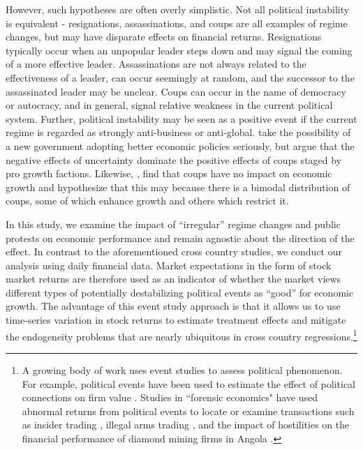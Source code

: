 \documentclass[12pt,final,fleqn]{article}
\theoremstyle{plain}
\begin{document}
However, such hypotheses are often overly simplistic. Not all political instability is equivalent - resignations, assassinations, and coups are all examples of regime changes, but may have disparate effects on financial returns. Resignations typically occur when an unpopular leader steps down and may signal the coming of a more effective leader. Assassinations are not always related to the effectiveness of a leader, can occur seemingly at random, and the successor to the assassinated leader may be unclear. Coups can occur in the name of democracy or autocracy, and in general, signal relative weakness in the current political system. Further, political instability may be seen as a positive event if the current regime is regarded as strongly anti-business or anti-global.  \citet{alesina1996political} take the possibility of a new government adopting better economic policies seriously, but argue that the negative effects of uncertainty dominate the positive effects of coups staged by pro growth factions. Likewise, \citet{londregan1990poverty}, find that coups have no impact on economic growth and hypothesize that this may because there is a bimodal distribution of coups, some of which enhance growth and others which restrict it. 

In this study, we examine the impact of ``irregular'' regime changes and public protests on economic performance and remain agnostic about the direction of the effect. In contrast to the aforementioned cross country studies, we  conduct our analysis using daily financial data. Market expectations in the form of stock market returns are therefore used as an indicator of whether the market views different types of potentially destabilizing political events as ``good'' for economic growth.  The advantage of this event study approach is that it allows us to use time-series variation in stock returns to estimate treatment effects and mitigate the endogeneity problems that are nearly ubiquitous in cross country regressions.\footnote{A growing body of work uses event studies to assess political phenomenon.  For example, political events have been used to estimate the effect of political connections on firm value \citep[e.g.][]{fisman2001estimating,faccio2006politically,goldman2009politically}. Studies in ``forensic economics" have used abnormal returns from political events to locate or examine transactions such as insider trading \citep{dube2011coups}, illegal arms trading \citep{dellavigna2010detecting}, and the impact of hostilities on the financial performance of diamond mining firms in Angola \citep{guidolin2007diamonds}.}
\end{document}
